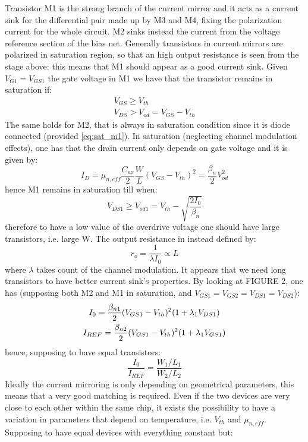 Transistor M1 is the strong branch of the current mirror and it acts as a current sink for the differential pair made up by M3 and M4, fixing the polarization current for the whole circuit. M2 sinks instead the current from the voltage reference section of the bias net.
Generally transistors in current mirrors are polarized in saturation region, so that an high output resistance is seen from the stage above: this means that M1 should appear as a good current sink.
Given $V_{G1}=V_{GS1}$ the gate voltage in M1 we have that the transistor remains in saturation if:
\begin{gather}
\label{eq:sat_m1}
V_{GS}\geq V_{th}  \\
V_{DS}>V_{od} = V_{GS}-V_{th} 
\end{gather}
The same holds for M2, that is always in saturation condition since it is diode connected (provided \ref{eq:sat_m1}). In saturation (neglecting channel modulation effects), one has that the drain current only depends on gate voltage and it is given by:
\begin{equation}
\label{eq:Id_quadLaw}
I_D = \mu_{n,eff} \frac{C_{ox}}{2} \frac{W}{L} (V_{GS}-V_{th})^2 = \frac{\beta_{n}}{2}V_{od}^2
\end{equation}
hence M1 remains in saturation till when:
\begin{equation}
V_{DS1}\geq V_{od1}= V_{th}-\sqrt{\frac{2I_0}{\beta_{n}}}
\end{equation}
therefore to have a low value of the overdrive voltage one should have large transistors, i.e. large W.
The output resistance in instead defined by:
\begin{equation}
 r_o = \frac{1}{\lambda I_0} \propto L
\end{equation}
where $\lambda$ takes count of the channel modulation. It appears that we need long transistors to have better current sink's properties.
By looking at FIGURE 2, one has (supposing both M2 and M1 in saturation, and $V_{GS1}=V_{GS2}=V_{DS1}=V_{DS2}$):
\begin{gather}
I_0 = \frac{\beta_{n1}}{2}(V_{GS1}-V_{th})^2(1+\lambda_1V_{DS1}) \notag \\
I_{REF} = \frac{\beta_{n2}}{2}(V_{GS1}-V_{th})^2(1+\lambda_1V_{GS1}) \notag
\end{gather}
hence, supposing to have equal transistors:
\begin{equation}
\frac{I_0}{I_{REF}} = \frac{W_1/L_1}{W_2/L_2} 
\end{equation}
Ideally the current mirroring is only depending on geometrical parameters, this means that a very good matching is required. Even if the two devices are very close to each other within the same chip, it exists the possibility to have a variation in parameters that depend on temperature, i.e. $V_{th}$ and $\mu_{n,eff}$. Supposing to have equal devices with everything constant but:
